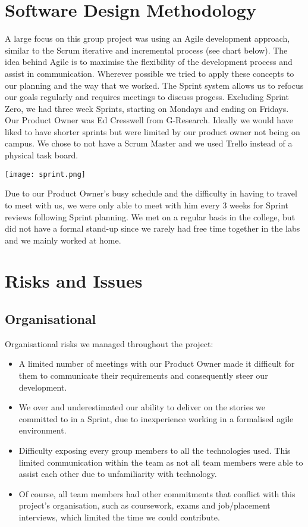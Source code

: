 \section{Software Design Methodology}
A large focus on this group project was using an Agile development approach, similar to the Scrum iterative and incremental process (see chart below). The idea behind Agile is to maximise the flexibility of the development process and assist in communication. Wherever possible we tried to apply these concepts to our planning and the way that we worked. The Sprint system allows us to refocus our goals regularly and requires meetings to discuss progess. Excluding Sprint Zero, we had three week Sprints, starting on Mondays and ending on Fridays. Our Product Owner was Ed Cresswell from G-Research.  Ideally we would have liked to have shorter sprints but were limited by our product owner not being on campus. We chose to not have a Scrum Master and we used Trello instead of a physical task board.

\begin{center}
\texttt{[image: sprint.png]}
\end{center}

Due to our Product Owner's busy schedule and the difficulty in having to travel to meet with us, we were only able to meet with him every 3 weeks for Sprint reviews following Sprint planning. We met on a regular basis in the college, but did not have a formal stand-up since we rarely had free time together in the labs and we mainly worked at home.

\section{Risks and Issues}
\subsection{Organisational}
Organisational risks we managed throughout the project:
\begin{itemize}
\item A limited number of meetings with our Product Owner made it difficult for them to communicate their requirements and consequently steer our development.
\item We over and underestimated our ability to deliver on the stories we committed to in a Sprint, due to inexperience working in a formalised agile environment.
\item Difficulty exposing every group members to all the technologies used. This limited communication within the team as not all team members were able to assist each other due to unfamiliarity with technology.
\item Of course, all team members had other commitments that conflict with this project's organisation, such as coursework, exams and job/placement interviews, which limited the time we could contribute.
\end{itemize}

